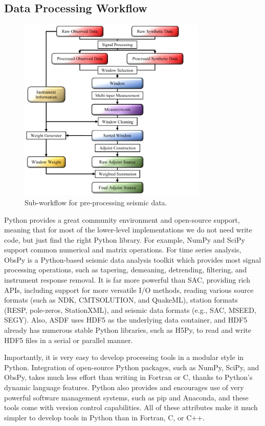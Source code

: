 \subsection{Data Processing Workflow}
\begin{figure}
  \centering
  \includegraphics[width=0.8\textwidth]{ch-GLADM25/figures/Preprocess_workflow.pdf}
  \caption[Sub-workflow for pre-processing seismic data]
  {\small{Sub-workflow for pre-processing seismic data.}}
  \label{fig:preprocess_workflow}
\end{figure}

Python provides a great community environment and open-source support,
meaning that for most
of the lower-level implementations we do not need write code, but
just find the right Python library.
For example,
NumPy and SciPy support common numerical and matrix operations.
For time series analysis,
ObsPy is a Python-based seismic data analysis toolkit which provides
most signal processing operations, such as tapering, demeaning, detrending, filtering, and instrument response removal.
It is far more powerful than SAC,
providing rich APIs, including support for more versatile I/O methods, reading
various source formats (such as NDK, CMTSOLUTION, and QuakeML),
station formats (RESP, pole-zeros, StationXML),
and seismic data formats (e.g., SAC, MSEED, SEGY).
Also, ASDF uses HDF5 as the underlying data container,
and HDF5 already has numerous stable Python libraries, such as H5Py,
to read and write HDF5 files in a serial or parallel manner.

Importantly, it is very easy to develop processing tools in a modular style in Python.
Integration of open-source Python packages,
such as NumPy, SciPy, and ObsPy, takes much
less effort than writing in Fortran or C, thanks to Python's dynamic language features.
Python also provides and encourages use of very powerful software management systems,
such as pip and Anaconda,
and these tools come with version control capabilities.
All of these attributes make it much simpler to develop tools in Python than in
Fortran, C, or C++.

